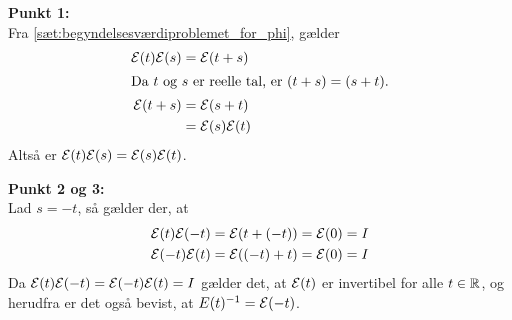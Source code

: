 \begin{bev}\textbf{} %
\newline
\textbf{Punkt 1:}\\
Fra \autoref{sæt:begyndelsesværdiproblemet_for_phi}, gælder
\begin{align*}
    \mathcal{E}(t)\mathcal{E}(s)&=\mathcal{E}(t+s)\\
    \intertext{Da $t$ og $s$ er reelle tal, er $(t+s)=(s+t)$.}
    \mathcal{E}(t+s)&=\mathcal{E}(s+t)\\
    &=\mathcal{E}(s)\mathcal{E}(t)
\end{align*}
Altså er $\mathcal{E}(t)\mathcal{E}(s)=\mathcal{E}(s)\mathcal{E}(t)$.

\textbf{Punkt 2 og 3:}\\
Lad $s=-t$, så gælder der, at
\begin{align*}
    \mathcal{E}(t)\mathcal{E}(-t) = \mathcal{E}(t+(-t)) = \mathcal{E}(0) = I\\
    \mathcal{E}(-t)\mathcal{E}(t) = \mathcal{E}((-t)+t) = \mathcal{E}(0) = I
\end{align*}
Da $\mathcal{E}(t)\mathcal{E}(-t) = \mathcal{E}(-t)\mathcal{E}(t) = I$ gælder det, at $\mathcal{E}(t)$ er invertibel for alle $t\in \mathbb{R}$, og herudfra er det også bevist, at $E(t)^{-1} = \mathcal{E}(-t)$.
\end{bev}
